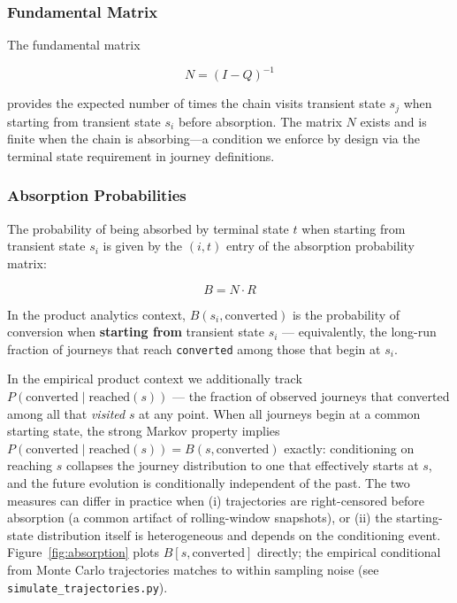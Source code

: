 \documentclass[12pt, a4paper]{article}
\begin{document}
\subsubsection{Fundamental Matrix}

The fundamental matrix

\begin{equation}
  N = (I - Q)^{-1}
  \label{eq:fundamental}
\end{equation}

provides the expected number of times the chain visits transient state $s_j$ when starting from transient state $s_i$ before absorption. The matrix $N$ exists and is finite when the chain is absorbing---a condition we enforce by design via the terminal state requirement in journey definitions.

\subsubsection{Absorption Probabilities}

The probability of being absorbed by terminal state $t$ when starting from transient state $s_i$ is given by the $(i, t)$ entry of the absorption probability matrix:

\begin{equation}
  B = N \cdot R
  \label{eq:absorption}
\end{equation}

In the product analytics context, $B(s_i, \text{converted})$ is the probability of conversion when \textbf{starting from} transient state $s_i$ --- equivalently, the long-run fraction of journeys that reach \texttt{converted} among those that begin at $s_i$.

In the empirical product context we additionally track $P(\text{converted} \mid \text{reached}(s))$ --- the fraction of observed journeys that converted among all that \emph{visited} $s$ at any point. When all journeys begin at a common starting state, the strong Markov property implies $P(\text{converted} \mid \text{reached}(s)) = B(s, \text{converted})$ exactly: conditioning on reaching $s$ collapses the journey distribution to one that effectively starts at $s$, and the future evolution is conditionally independent of the past. The two measures can differ in practice when (i) trajectories are right-censored before absorption (a common artifact of rolling-window snapshots), or (ii) the starting-state distribution itself is heterogeneous and depends on the conditioning event. Figure~\ref{fig:absorption} plots $B[s, \text{converted}]$ directly; the empirical conditional from Monte Carlo trajectories matches to within sampling noise (see \texttt{simulate\_trajectories.py}).
\end{document}
